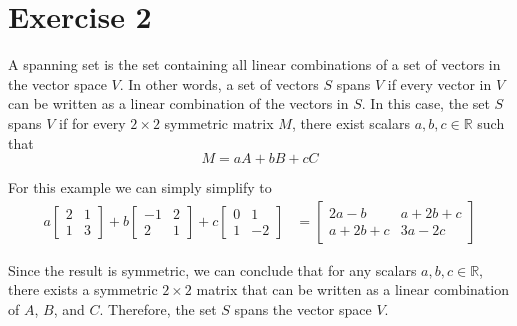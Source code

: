 \section{Exercise 2}

A spanning set is the set containing all linear combinations of a set of vectors in the vector space $V$. In other words, a set of vectors $S$ spans $V$ if every vector in $V$ can be written as a linear combination of the vectors in $S$. In this case, the set $S$ spans $V$ if for every $2\times 2$ symmetric matrix $M$, there exist scalars $a,b,c\in\mathbb{R}$ such that
$$
	M = aA + bB + cC
$$

For this example we can simply simplify to
\begin{align*}
	a\begin{bmatrix}2 & 1\\1 & 3\end{bmatrix} + b\begin{bmatrix}-1 & 2\\2 & 1\end{bmatrix} + c\begin{bmatrix}0 & 1\\1 & -2\end{bmatrix} & = \begin{bmatrix}2a - b & a + 2b + c\\a + 2b + c & 3a - 2c\end{bmatrix}
\end{align*}

Since the result is symmetric, we can conclude that for any scalars $a,b,c \in \mathbb{R}$, there exists a symmetric $2\times 2$ matrix that can be written as a linear combination of $A$, $B$, and $C$. Therefore, the set $S$ spans the vector space $V$.
